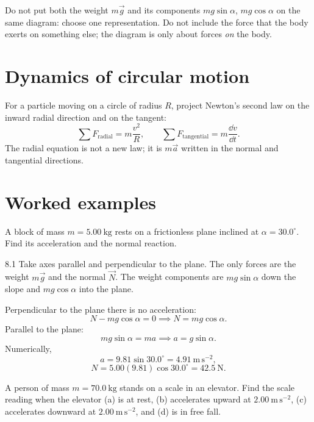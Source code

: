 \begin{warning}
Do not put both the weight $m\vec g$ and its components $mg\sin\alpha$,
$mg\cos\alpha$ on the same diagram: choose one representation. Do not include
the force that the body exerts on something else; the diagram is only about
forces \emph{on} the body.
\end{warning}

\section{Dynamics of circular motion}

For a particle moving on a circle of radius $R$, project Newton's second law on
the inward radial direction and on the tangent:
\[
\sum F_{\text{radial}}=m\frac{v^2}{R},
\qquad
\sum F_{\text{tangential}}=m\frac{\dd v}{\dd t}.
\]
The radial equation is not a new law; it is $m\vec a$ written in the normal and
tangential directions.

\section{Worked examples}

\begin{worked}
A block of mass $m=5.00\ \mathrm{kg}$ rests on a frictionless plane inclined at
$\alpha=30.0^\circ$. Find its acceleration and the normal reaction.
\end{worked}

\begin{solution}{8.1}
Take axes parallel and perpendicular to the plane. The only forces are the weight
$m\vec g$ and the normal $\vec N$. The weight components are
$mg\sin\alpha$ down the slope and $mg\cos\alpha$ into the plane.

Perpendicular to the plane there is no acceleration:
\[
N-mg\cos\alpha=0
\implies
N=mg\cos\alpha.
\]
Parallel to the plane:
\[
mg\sin\alpha=ma
\implies
a=g\sin\alpha.
\]
Numerically,
\[
a=9.81\sin30.0^\circ=4.91\ \mathrm{m\,s^{-2}},
\]
\[
N=5.00(9.81)\cos30.0^\circ=42.5\ \mathrm{N}.
\]
\end{solution}

\begin{worked}
A person of mass $m=70.0\ \mathrm{kg}$ stands on a scale in an elevator. Find the
scale reading when the elevator (a) is at rest, (b) accelerates upward at
$2.00\ \mathrm{m\,s^{-2}}$, (c) accelerates downward at $2.00\ \mathrm{m\,s^{-2}}$,
and (d) is in free fall.
\end{worked}

